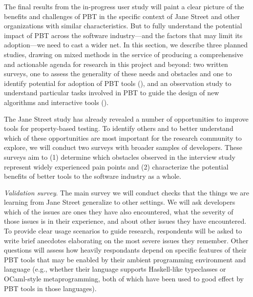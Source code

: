 

The final results from the in-progress user study will paint a clear
picture of the benefits and challenges of PBT in the specific context
of Jane Street and other organizations with similar characteristics.  But to
fully understand the potential impact of PBT across the software
industry---and the factors that may limit its adoption---we need to
cast a wider net.
%
In this section, we describe three planned studies, drawing on mixed
methods in the service of producing a comprehensive and actionable
agenda for research in this project and beyond: two
written surveys, one to assess the generality of these needs and obstacles
and one to identify potential for adoption of PBT tools
(), and an observation study to understand
particular tasks involved in PBT to guide the design of new algorithms
and interactive tools ().

%
The Jane Street study has already revealed a number of
opportunities to improve tools for property-based testing. To identify
others and to better understand which of these opportunities are most
important for the research community to explore, we will conduct two
surveys with broader samples of developers. These surveys aim to
(1) determine which obstacles observed in the interview study
represent widely experienced pain points and
(2) characterize the potential benefits of better tools to the
software industry as a whole.

\emph{Validation survey}. The main survey we will conduct checks that
the things we are learning from Jane Street generalize to other settings.
We will
ask developers which of the issues are
ones they have also encountered, what the severity of those issues is
in their experience, and about
other issues they have encountered.
To provide
clear usage scenarios to guide research, respondents will
be asked to write brief anecdotes elaborating on the
most severe issues they remember.  Other questions will assess how
heavily respondants depend on specific features of their PBT tools
that may be enabled by their
ambient programming environment and language (e.g., whether their
language supports Haskell-like typeclasses or OCaml-style
metaprogramming, both of which have been used to good effect by
PBT tools in those languages).

